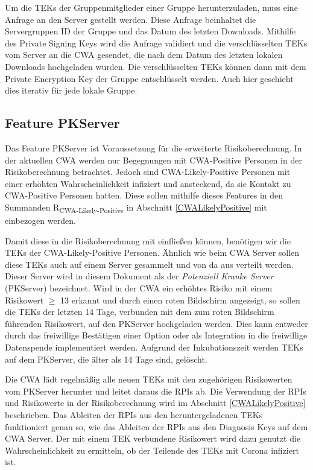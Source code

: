 \documentclass[conference,compsoc]{IEEEtran}
\begin{document}
Um die TEKs der Gruppenmitglieder einer Gruppe herunterzuladen, muss eine Anfrage an den Server gestellt werden.
Diese Anfrage beinhaltet die Servergruppen ID der Gruppe und das Datum des letzten Downloads.
Mithilfe des Private Signing Keys wird die Anfrage validiert und die verschlüsselten TEKs vom Server an die CWA gesendet, die nach dem Datum des letzten lokalen Downloads hochgeladen wurden.
Die verschlüsselten TEKs können dann mit dem Private Encryption Key der Gruppe entschlüsselt werden.
Auch hier geschieht dies iterativ für jede lokale Gruppe.\\

\subsection{Feature PKServer}
\label{PKServer}

Das Feature PKServer ist Voraussetzung für die erweiterte Risikoberechnung.
In der aktuellen CWA werden nur Begegnungen mit CWA-Positive Personen in der Risikoberechnung betrachtet.
Jedoch sind CWA-Likely-Positive Personen mit einer erhöhten Wahrscheinlichkeit infiziert und ansteckend, da sie Kontakt zu CWA-Positive Personen hatten.
Diese sollen mithilfe dieses Features in den Summanden R\textsubscript{CWA-Likely-Positive} in Abschnitt \ref{CWALikelyPositive} mit einbezogen werden.

Damit diese in die Risikoberechnung mit einfließen können, benötigen wir die TEKs der CWA-Likely-Positive Personen.
Ähnlich wie beim CWA Server sollen diese TEKs auch auf einem Server gesammelt und von da aus verteilt werden.
Dieser Server wird in diesem Dokument als der \textit{Potenziell Kranke Server} (PKServer) bezeichnet.
Wird in der CWA ein erhöhtes Risiko mit einem Risikowert $\geq$ 13 erkannt und durch einen roten Bildschirm angezeigt, so sollen die TEKs der letzten 14 Tage, verbunden mit dem zum roten Bildschirm führenden Risikowert, auf den PKServer hochgeladen werden.
Dies kann entweder durch das freiwillige Bestätigen einer Option oder als Integration in die freiwillige Datenspende implementiert werden.
Aufgrund der Inkubationszeit werden TEKs auf dem PKServer, die älter als 14 Tage sind, gelöscht.

Die CWA lädt regelmäßig alle neuen TEKs mit den zugehörigen Risikowerten vom PKServer herunter und leitet daraus die RPIs ab.
Die Verwendung der RPIs und Risikowerte in der Risikoberechnung wird im Abschnitt \ref{CWALikelyPositive} beschrieben.
Das Ableiten der RPIs aus den heruntergeladenen TEKs funktioniert genau so, wie das Ableiten der RPIs aus den Diagnosis Keys auf dem CWA Server.
Der mit einem TEK verbundene Risikowert wird dazu genutzt die Wahrscheinlichkeit zu ermitteln, ob der Teilende des TEKs mit Corona infiziert ist.
\end{document}

